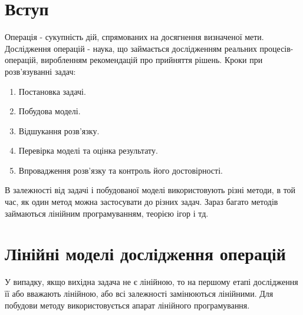 \documentclass[12pt]{book}
\begin{document}
\tableofcontents
\chapter{Вступ}
Операція - сукупність дій, спрямованих на досягнення визначеної мети.
Дослідження операцій - наука, що займається дослідженням реальних процесів-операцій, виробленням рекомендацій про прийняття рішень.
Кроки при розв'язуванні задач:
\begin{enumerate}
\item Постановка задачі.
\item Побудова моделі.
\item Відшукання розв'язку.
\item Перевірка моделі та оцінка результату.
\item Впровадження розв'язку та контроль його достовірності.
\end{enumerate}
В залежності від задачі і побудованої моделі використовують різні методи, в той час, як один метод можна застосувати до різних задач. Зараз багато методів займаються лінійним програмуванням, теорією ігор і тд.

\chapter{Лінійні моделі дослідження операцій}
У випадку, якщо вихідна задача не є лінійною, то на першому етапі дослідження її або вважають лінійною, або всі залежності замінюються лінійними. Для побудови методу використовується апарат лінійного програмування.
\end{document}
